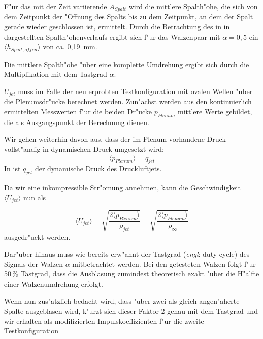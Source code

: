 F"ur das mit der Zeit variierende $A_{Spalt}$ wird die mittlere Spalth"ohe, die sich von dem Zeitpunkt der "Offnung des Spalts bis zu dem Zeitpunkt, an dem der Spalt gerade wieder geschlossen ist, ermittelt.  
Durch die Betrachtung des in  in  dargestellten Spalth"ohenverlaufs ergibt sich f"ur das Walzenpaar mit $\alpha = 0,5$ ein $\langle{h_{Spalt,offen}}\rangle$ von ca. 0,19 \,mm.

Die mittlere Spalth"ohe "uber eine komplette Umdrehung ergibt sich durch die Multiplikation mit dem Tastgrad $\alpha$.

$U_{jet}$ muss im Falle der neu erprobten Testkonfiguration mit ovalen Wellen "uber die Plenumsdr"ucke berechnet werden.
Zun"achst werden aus den kontinuierlich ermittelten Messwerten f"ur die beiden Dr"ucke $p_{Plenum}$ mittlere Werte gebildet, die als Ausgangspunkt der Berechnung dienen.

Wir gehen weiterhin davon aus, dass der im Plenum vorhandene Druck vollst"andig in dynamischen Druck umgesetzt wird:
	\begin{equation}
	\label{eq:Annahme q}
		\langle{p_{Plenum}}\rangle = q_{jet}
	\end{equation}
In ist $q_{jet}$ der dynamische Druck des Druckluftjets.

Da wir eine inkompressible Str"omung annehmen, kann die Geschwindigkeit $\langle{U_{jet}}\rangle$ nun als
	
	\begin{equation}
	\label{eq:jetgeschwindigkeit}
		\langle{U_{jet}}\rangle = \sqrt{\frac{2 \langle{p_{Plenum}}\rangle}{\rho_{jet}}} = \sqrt{\frac{2 \langle{p_{Plenum}}\rangle}{\rho_{\infty}}}
	\end{equation}
ausgedr"uckt werden.

Dar"uber hinaus muss wie bereits erw"ahnt der Tastgrad (\textit{engl}: duty cycle) des Signals der Walzen $\alpha$  mitbetrachtet werden.
Bei den getesteten Walzen folgt f"ur 50\,\% Tastgrad, dass die Ausblasung zumindest theoretisch exakt "uber die H"alfte einer Walzenumdrehung erfolgt.

Wenn nun zus"atzlich bedacht wird, dass "uber zwei als gleich angen"aherte Spalte ausgeblasen wird, k"urzt sich dieser Faktor 2 genau mit dem Tastgrad und wir erhalten als modifizierten Impulskoeffizienten f"ur die zweite Testkonfiguration

